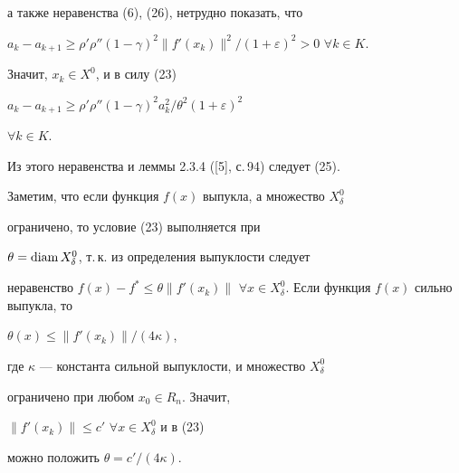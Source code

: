 \begin{pf}
а также неравенства (6), (26), нетрудно показать, что


$a_k-a_{k+1}\geq {\rho }'{\rho }''(1-\gamma )^2\|f'(x_k)\| ^2/


(1+\varepsilon )^2>0$ $\forall k\in K$.


Значит, $x_k\in X^0$, и в силу (23)


$a_k-a_{k+1}\ge{\rho}'{\rho}''(1-\gamma)^2a_k^2/\theta^2(1+\varepsilon)^2$


$\forall k\in K$.


Из этого неравенства и леммы 2.3.4 ([5], с.\,94) следует (25).


\end{pf}





Заметим, что если функция $f(x)$ выпукла, а множество $X^0_{\delta}$


ограничено, то условие (23) выполняется при 


$\theta =\operatorname{diam} X^0_{\delta}$, т.\,к.{} из определения выпуклости следует


неравенство $f(x)-f^{*}\leq \theta \|f'(x_k)\|$ $\forall x\in 


X^0_{\delta}$. Если функция $f(x)$ сильно выпукла, то 


$\theta (x)\leq \|f'(x_k)\| /(4\kappa )$, 


где $\kappa$ --- константа сильной выпуклости, и множество $X^0_{\delta}$


ограничено при любом $x_0\in R_n$. Значит,


$\|f'(x_k) \| \leq {c}'$ $\forall x\in X^0_{\delta }$ и в (23)


можно положить $\theta ={c}'/(4\kappa)$. 





